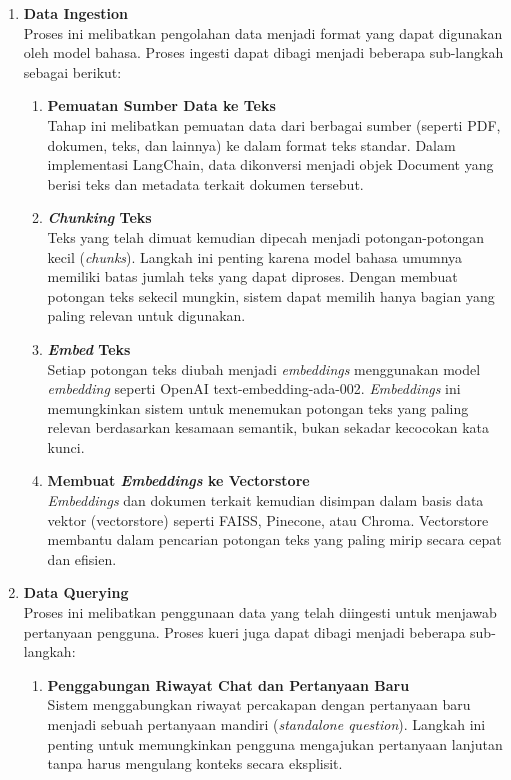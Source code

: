 \begin{enumerate}
  \item \textbf{Data Ingestion} \\
  Proses ini melibatkan pengolahan data menjadi format yang dapat digunakan oleh model bahasa. Proses ingesti dapat dibagi menjadi beberapa sub-langkah sebagai berikut:
  \begin{enumerate}
    \item \textbf{Pemuatan Sumber Data ke Teks} \\
    Tahap ini melibatkan pemuatan data dari berbagai sumber (seperti PDF, dokumen, teks, dan lainnya) ke dalam format teks standar. Dalam implementasi LangChain, data dikonversi menjadi objek Document yang berisi teks dan metadata terkait dokumen tersebut.
    \item \textbf{\textit{Chunking} Teks} \\
    Teks yang telah dimuat kemudian dipecah menjadi potongan-potongan kecil (\textit{chunks}). Langkah ini penting karena model bahasa umumnya memiliki batas jumlah teks yang dapat diproses. Dengan membuat potongan teks sekecil mungkin, sistem dapat memilih hanya bagian yang paling relevan untuk digunakan.
    \item \textbf{\textit{Embed} Teks} \\
    Setiap potongan teks diubah menjadi \textit{embeddings} menggunakan model \textit{embedding} seperti OpenAI text-embedding-ada-002. \textit{Embeddings} ini memungkinkan sistem untuk menemukan potongan teks yang paling relevan berdasarkan kesamaan semantik, bukan sekadar kecocokan kata kunci.
    \item \textbf{Membuat \textit{Embeddings} ke Vectorstore} \\
    \textit{Embeddings} dan dokumen terkait kemudian disimpan dalam basis data vektor (vectorstore) seperti FAISS, Pinecone, atau Chroma. Vectorstore membantu dalam pencarian potongan teks yang paling mirip secara cepat dan efisien.
  \end{enumerate}
  \item \textbf{Data Querying} \\
  Proses ini melibatkan penggunaan data yang telah diingesti untuk menjawab pertanyaan pengguna. Proses kueri juga dapat dibagi menjadi beberapa sub-langkah:
  \begin{enumerate}
    \item \textbf{Penggabungan Riwayat Chat dan Pertanyaan Baru} \\
    Sistem menggabungkan riwayat percakapan dengan pertanyaan baru menjadi sebuah pertanyaan mandiri (\textit{standalone question}). Langkah ini penting untuk memungkinkan pengguna mengajukan pertanyaan lanjutan tanpa harus mengulang konteks secara eksplisit.

\end{enumerate}
\end{enumerate}
